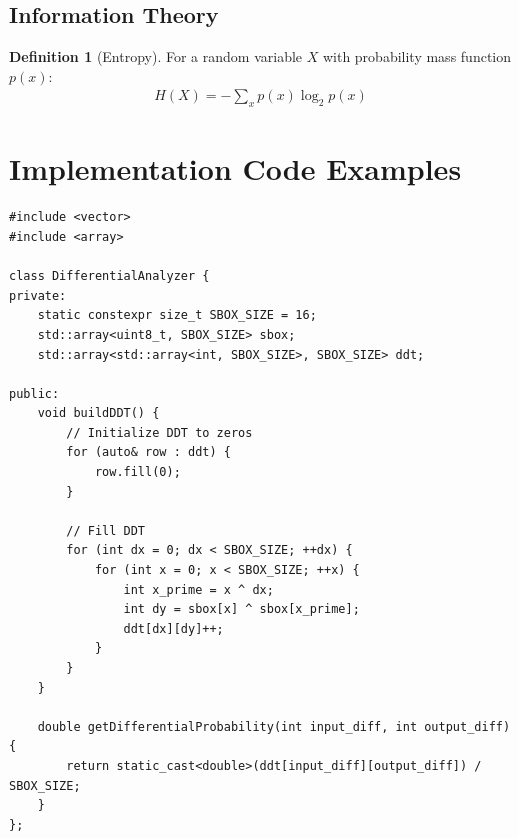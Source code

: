 \documentclass[12pt,a4paper]{article}
\theoremstyle{definition}
\newtheorem{definition}{Definition}[section]
\begin{document}
\subsection{Information Theory}

\begin{definition}[Entropy]
For a random variable $X$ with probability mass function $p(x)$:
\begin{align}
H(X) = -\sum_{x} p(x) \log_2 p(x)
\end{align}
\end{definition}

\section{Implementation Code Examples}

\begin{lstlisting}[style=cryptoCode, caption={Differential Distribution Table (DDT) Construction and Analysis}]
#include <vector>
#include <array>

class DifferentialAnalyzer {
private:
    static constexpr size_t SBOX_SIZE = 16;
    std::array<uint8_t, SBOX_SIZE> sbox;
    std::array<std::array<int, SBOX_SIZE>, SBOX_SIZE> ddt;
    
public:
    void buildDDT() {
        // Initialize DDT to zeros
        for (auto& row : ddt) {
            row.fill(0);
        }
        
        // Fill DDT
        for (int dx = 0; dx < SBOX_SIZE; ++dx) {
            for (int x = 0; x < SBOX_SIZE; ++x) {
                int x_prime = x ^ dx;
                int dy = sbox[x] ^ sbox[x_prime];
                ddt[dx][dy]++;
            }
        }
    }
    
    double getDifferentialProbability(int input_diff, int output_diff) {
        return static_cast<double>(ddt[input_diff][output_diff]) / SBOX_SIZE;
    }
};
\end{lstlisting}
\end{document}
